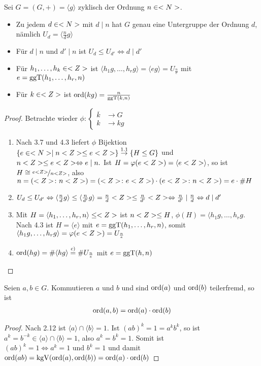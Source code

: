 \begin{proposition}
	Sei $G=(G,+)=\langle g \rangle$ zyklisch der Ordnung $n \in <N>$.
	\begin{itemize}
		\item Zu jedem $d \in <N>$ mit $d\mid n$ hat $G$ genau eine Untergruppe der Ordnung $d$, nämlich $U_d=\langle \frac{n}{d}g\rangle$
		\item Für $d \mid n$ und $d'\mid n$ ist $U_d \leq U_{d'} \Leftrightarrow d \mid d'$
		\item Für $h_1, \dots , h_k \in <Z>$ ist $\langle h_1 g, \dots, h_r g \rangle = \langle eg\rangle = U_{\frac{n}{e}}$ mit $e = \operatorname{ggT}(h_1,\dots,h_r,n)$
		\item Für $k \in <Z>$ ist $\operatorname{ord}(kg)= \frac{n}{\operatorname{ggT}(k,n)}$
	\end{itemize}
\end{proposition}
\begin{proof}
	Betrachte wieder $\phi: \begin{cases}
	\overline{k} &\to G \\
	k &\to kg
	\end{cases}$
	\begin{enumerate}
		\item Nach 3.7 und 4.3 liefert $\phi$ Bijektion $\{ e \in <N> \mid n<Z> \leq e<Z> \} \overset{1.1}{\rightarrow} \{ H \leq G \}$ und $n<Z> \leq e<Z> \Leftrightarrow e \mid n.$ Ist $H = \varphi(e<Z>) = \langle e<Z> \rangle$, so ist $H \cong \nicefrac{e<Z>}{n<Z>}$, also $n = (<Z> \colon n <Z>) = (<Z> \colon e<Z>)\cdot(e<Z> \colon n<Z>) = e \cdot \#H$
		\item $U_d \leq U_{d'} \Leftrightarrow \langle \frac{n}{d}g \rangle \leq \langle \frac{n}{d'}g \rangle = \frac{n}{d}<Z> \leq \frac{n}{d'}<Z> \Leftrightarrow \frac{n}{d'} \mid \frac{n}{d} \Leftrightarrow d \mid d'$
		\item Mit $H = \langle h_1, \dots, h_r,n \rangle \leq <Z>$ ist $n<Z> \leq H$, $\phi(H) = \langle h_1 g, \dots, h_r g$. Nach 4.3 ist $H = \langle e \rangle$ mit $e = \operatorname{ggT}(h_1, \dots, h_r, n)$, somit $\langle h_1 g, \dots, h_r g \rangle = \varphi(e<Z>) = U_{\frac{n}{e}}$
		\item $\operatorname{ord}(hg) = \#\langle hg \rangle \overset{c)}{=} \#U_{\frac{n}{e}}$ mit $e = \operatorname{ggT}(h,n)$
	\end{enumerate}
\end{proof}

\begin{lemma}
	Seien $a,b \in G$. Kommutieren $a \text{ und } b$ und sind $\operatorname{ord}(a)$ und $\operatorname{ord}(b)$ teilerfremd, so ist
	\begin{align}
		\operatorname{ord}(a,b) = \operatorname{ord}(a)\cdot \operatorname{ord}(b) \notag
	\end{align}
\end{lemma}
\begin{proof}
	Nach 2.12 ist $\langle a \rangle \cap \langle b \rangle = 1$. Ist $(ab)^k = 1 = a^k b^k$, so ist $a^k = b^{-k} \in \langle a \rangle \cap \langle b \rangle = 1$, also $a^k = b^k = 1$. Somit ist $(ab)^k = 1 \Leftrightarrow a^k = 1 \text{ und } b^k =1$ und damit $\operatorname{ord}(ab) = \operatorname{kgV}(\operatorname{ord}(a), \operatorname{ord}(b)) = \operatorname{ord}(a) \cdot \operatorname{ord}(b)$
\end{proof}

